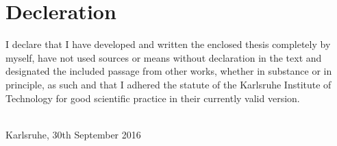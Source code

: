 \thispagestyle{empty}


\vspace*{8cm}


\section*{Decleration}

 I declare that I have developed and written the enclosed thesis completely by myself, have not used sources or means without declaration in the text and designated the included passage from other works, whether in substance or in principle, as such and that I adhered the statute of the Karlsruhe Institute of Technology for good scientific practice in their currently valid version.


~\\[2ex] 
\noindent
Karlsruhe, 30th September 2016
~\\[5ex]
